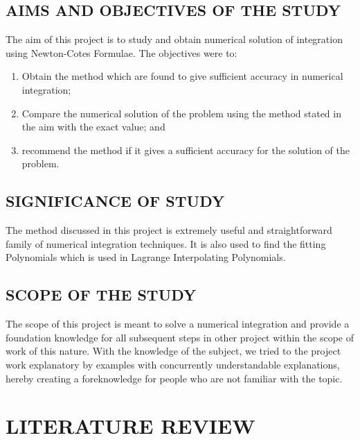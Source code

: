 \documentclass[12pt]{report}
\newcommand{\NCF}{Newton-Cotes Formulae}
\begin{document}
	\section{AIMS AND OBJECTIVES OF THE STUDY}
	The aim of this project is to study and obtain numerical solution of integration using \NCF. The objectives were to:
	\begin{enumerate}
		\item Obtain the method which are found to give sufficient accuracy in numerical integration;
		
		\item Compare the numerical solution of the problem using the method stated in the aim with the exact value; and 
		
		\item recommend the method if it gives a sufficient accuracy for the solution of the problem.
	\end{enumerate}

	\section{SIGNIFICANCE OF STUDY}
	The method discussed in this project is extremely useful and straightforward family of numerical integration techniques. It is also used to find the fitting Polynomials which is used in Lagrange Interpolating Polynomials.
	
	\section{SCOPE OF THE STUDY}
	The scope of this project is meant to solve a numerical integration and provide a foundation knowledge for all subsequent steps in other project within the scope of work of this nature. With the knowledge of the subject, we tried to the project work explanatory by examples with concurrently understandable explanations, hereby creating a foreknowledge for people who are not familiar with the topic.
	
	\newpage
	
	\chapter{LITERATURE REVIEW}
	
\end{document}

